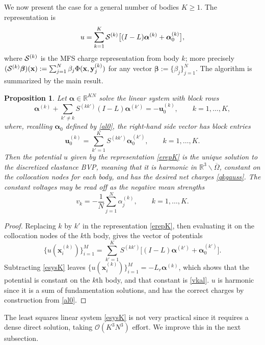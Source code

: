 \documentclass[10pt]{article}
\newcommand{\be}{\begin{equation}}
\newcommand{\ee}{\end{equation}}
\newcommand{\mbf}[1]{{\mathbf #1}}
\newcommand{\R}{\mathbb{R}}
\newcommand{\bigO}{{\mathcal O}}
\newtheorem{pro}[thm]{Proposition}
\newcommand{\x}{\mathbf{x}}
\newcommand{\y}{\mathbf{y}}
\newcommand{\bal}{\bm{\alpha}}
\newcommand{\E}{\R^3\backslash\overline{\Omega}}    %
\newcommand{\ok}{^{(k)}}
\newcommand{\okp}{^{(k')}}
\newcommand{\SR}{{\cal S}}           %
\begin{document}
We now present the case for a general number of bodies $K\ge 1$.
The representation is
\be
u = \sum_{k=1}^K \SR\ok \bigl[ (I-L)\bal\ok + \bal_0\ok \bigr],
\label{erepK}
\ee
where $\SR\ok$ is the MFS charge representation from body $k$;
more precisely
$(\SR\ok \bm{\beta})(\x) := \sum_{j=1}^N \beta_j \Phi(\x,\y\ok_j)$
for any vector $\bm{\beta}:=\{\beta_j\}_{j=1}^N$.
The algorithm is summarized by the main result.
\begin{pro} Let $\bal\in\R^{KN}$ solve the linear system with block rows
  \be
     [S(I-L) + L_r] \bal\ok + \sum_{k'\neq k} S^{(kk')}(I-L)\bal\okp = -\mbf{u}\ok_0
     ,\qquad k=1,\dots,K,
  \label{esysK}
  \ee
  where, recalling $\bal_0$ defined by \eqref{al0}, the right-hand side vector has block entries
  \be
  \mbf{u}\ok_0 = \sum_{k'=1}^K S^{(kk')} \bal\okp_0, \qquad k=1,\dots,K.
  \label{erhsK}
  \ee
  Then the potential $u$ given by the representation \eqref{erepK} is the unique solution
  to the discretized elastance BVP, meaning that
  it is harmonic in $\E$, constant
  on the collocation nodes for each body, and has the
  desired net charges \eqref{qkgauss}.
  The constant voltages may be read off as the negative mean strengths
  \be
  v_k = -\frac{1}{N}\sum_{j=1}^N \alpha\ok_j, \qquad k=1,\dots,K.
  \label{vkal}
  \ee
\end{pro}
\begin{proof}
  Replacing $k$ by $k'$ in the representation \eqref{erepK},
  then evaluating it on the collocation nodes of the $k$th body,
  gives the vector of potentials
  \[
  \{u(\x\ok_i)\}_{i=1}^M =
  \sum_{k'=1}^K S^{(kk')}\bigl[  (I-L)\bal\okp + \bal\okp_0 \bigr].
  \]
  Subtracting \eqref{esysK} leaves $\{u(\x\ok_i)\}_{i=1}^M = -L_r \bal\ok$,
  which shows that the potential is constant on the $k$th body,
  and that constant is \eqref{vkal}.
  $u$ is harmonic since it is a sum of fundamentation solutions,
  and has the correct charges by construction from \eqref{al0}.
\end{proof}

The least squares linear system \eqref{esysK} is not very practical
since it requires a dense direct solution, taking $\bigO(K^3N^3)$ effort.
We improve this in the next subsection.
\end{document}
